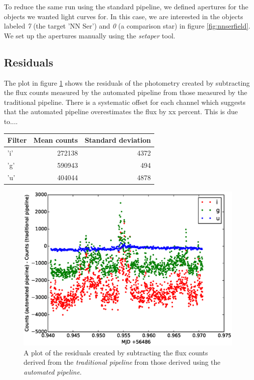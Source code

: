 To reduce the same run using the standard pipeline, we defined apertures for the objects we wanted light curves for. In this case, we are interested in the objects labeled \emph{7} (the target 'NN Ser') and \emph{0} (a comparison star) in figure \ref{fig:nnserfield}. We set up the apertures manually using the \emph{setaper} tool. 

\subsection{Residuals}
The plot in figure \ref{fig:residualplot} shows the residuals of the photometry created by subtracting the flux counts measured by the automated pipeline from those measured by the traditional pipeline. There is a systematic offset for each channel which suggests that the automated pipeline overestimates the flux by xx percent. This is due to.... 

\begin{center}
	\begin{tabular}{|l|r|r|}
		\hline
		Filter & Mean counts & Standard deviation\\
		\hline
		'i' & 272138 & 4372 \\
		'g' & 590943 & 494 \\
		'u' & 404044 & 4878\\
		\hline
	\end{tabular}
\end{center}


\begin{figure}[!h]
\centering
\includegraphics[width=140mm]{images/residuals.eps}
\caption{A plot of the residuals created by subtracting the flux counts derived from the \emph{traditional pipeline} from those derived using the \emph{automated pipeline}. }
\label{fig:residualplot}
\end{figure}

